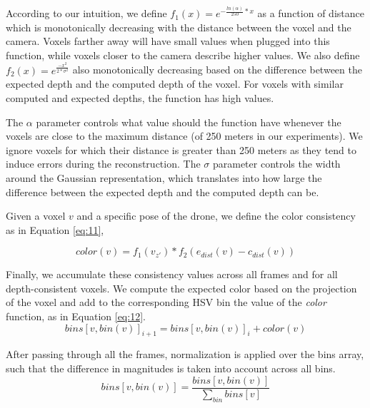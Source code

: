 \documentclass{article}
\begin{document}
According to our intuition, we define $f_1(x) = e^{-\frac{ln(\alpha)}{250} * x}$ as a function of distance which is monotonically decreasing with the distance between the voxel and the camera. Voxels farther away will have small values when plugged into this function, while voxels closer to the camera describe higher values. We also define $f_2(x) = e^{\frac{-x^2}{2 * \sigma ^ 2}}$ also monotonically decreasing based on the difference between the expected depth and the computed depth of the voxel. For voxels with similar computed and expected depths, the function has high values.


The \(\alpha\) parameter controls what value should the function have whenever the voxels are close to the maximum distance (of 250 meters in our experiments). We ignore voxels for which their distance is greater than 250 meters as they tend to induce errors during the reconstruction. The \(\sigma\) parameter controls the width around the Gaussian representation, which translates into how large the difference between the expected depth and the computed depth can be. 

Given a voxel \(v\) and a specific pose of the drone, we define the color consistency as in Equation \ref{eq:11}, 

\begin{equation}\label{eq:11}
color(v) = f_1(v_{z'}) * f_2(e_{dist}(v) - c_{dist}(v))
\end{equation}

Finally, we accumulate these consistency values across all frames and for all depth-consistent voxels. We compute the expected color based on the projection of the voxel and add to the corresponding HSV bin the value of the \textit{color} function, as in Equation \ref{eq:12}.
\begin{equation} \label{eq:12}
bins[v, bin(v)]_{i+1} = bins[v, bin(v)]_{i} + color(v)
\end{equation}

After passing through all the frames, normalization is applied over the bins array, such that the difference in magnitudes is taken into account across all bins.
\begin{equation} \label{eq:13}
bins[v, bin(v)] = \frac{bins[v, bin(v)]}{\sum_{bin}bins[v]}
\end{equation}
\end{document}
